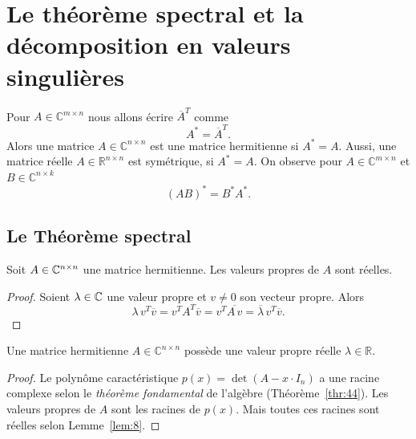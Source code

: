 \chapter{Le théorème spectral et la décomposition en valeurs singulières}

\label{cha:appl-auto-adjo}





Pour $A ∈ ℂ^{m ×n}$  nous allons écrire $\overline{A}^T$ comme
\begin{displaymath}
  A^* = \overline{A}^T. 
\end{displaymath}
Alors une matrice $A ∈ ℂ^{n ×n}$ est une matrice hermitienne si $A^* = A$. Aussi, une matrice réelle $A ∈ ℝ^{n ×n}$ est symétrique, si $A^* = A$.
On observe pour $A ∈ ℂ^{m ×n}$ et $B ∈ ℂ^{n ×k}$
\begin{displaymath}
  (A B)^* = B^* A^*.  
\end{displaymath}



 

\section{Le Théorème spectral}
\label{sec:les-endom-auto}

\begin{lemma}
  \label{lem:8}
  Soit $A \in \mathbb{C}^{n \times n}$ une matrice hermitienne. Les valeurs propres de $A$ sont réelles. 
\end{lemma}
\begin{proof}
  Soient $\lambda \in \mathbb{C}$ une valeur propre et $v \neq 0$ son vecteur propre. Alors 
  \begin{displaymath}
    \lambda \, v^T \overline{v}  = v^T {A}^T \overline{v} = 
    v^T \overline{A \, v} = \overline{\lambda}  \, v^T \overline{v}. 
  \end{displaymath}
\end{proof}

\begin{corollary}
  \label{co:7}
  Une matrice hermitienne  $A \in ℂ^{n \times n}$  possède une valeur propre réelle $λ ∈ ℝ$. 
\end{corollary}

\begin{proof}
  Le polynôme caractéristique $p(x) = \det(A - x \cdot I_n)$ a une racine complexe selon le \emph{théorème fondamental} de l'algèbre (Théorème~\ref{thr:44}). Les valeurs propres de $A$ sont les racines de $p(x)$.  Mais toutes ces racines sont réelles selon Lemme~\ref{lem:8}.  
\end{proof}


